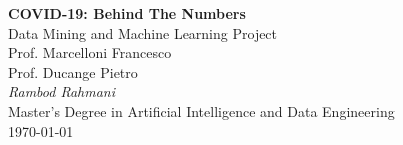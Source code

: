 \documentclass[11pt,a4paper]{article}
\begin{document}
\begin{center}
	\huge{\bfseries{COVID-19: Behind The Numbers}}\\
	\vspace{1.0cm}
	\large{Data Mining and Machine Learning Project}\\
	\vspace{0.2cm}
	\large{Prof. Marcelloni Francesco}\\
	\vspace{0.2cm}
	\large{Prof. Ducange Pietro}\\
	\vspace{1.0cm}
	\large\textit{Rambod Rahmani}\\
	\vspace{0.2cm}
	\scriptsize{Master's Degree in Artificial Intelligence and
	Data Engineering}\\
	\vspace{1.0cm}
	\normalsize{\today}
\end{center}

\vspace{2.0cm}
\tableofcontents

\newpage
\end{document}
